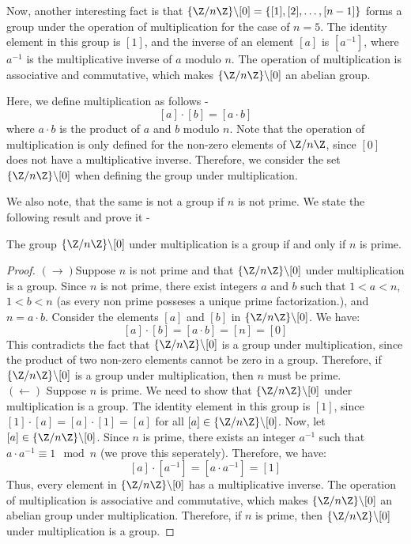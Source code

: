 \documentclass[openany]{book}
\begin{document}
Now, another interesting fact is that $\{\Z/n\Z\} \backslash {[0]} = \{[1], [2], \ldots, [n-1]\}$ forms a group under the operation of multiplication for the case of $n=5$. The identity element in this group is $[1]$, and the inverse of an element $[a]$ is $[a^{-1}]$, where $a^{-1}$ is the multiplicative inverse of $a$ modulo $n$. The operation of multiplication is associative and commutative, which makes $\{\Z/n\Z\} \backslash {[0]}$ an abelian group. \\
\begin{mynote}
    Here, we define multiplication as follows - 
    \[[a] \cdot [b] = [a \cdot b]\]
    where $a \cdot b$ is the product of $a$ and $b$ modulo $n$. Note that the operation of multiplication is only defined for the non-zero elements of $\Z/n\Z$, since $[0]$ does not have a multiplicative inverse. Therefore, we consider the set $\{\Z/n\Z\} \backslash {[0]}$ when defining the group under multiplication.
\end{mynote}
We also note, that the same is not a group if $n$ is not prime. 
We state the following result and prove it - 
\begin{mytheorem}
    The group $\{\Z/n\Z\} \backslash {[0]}$ under multiplication is a group if and only if $n$ is prime.
\end{mytheorem}
\begin{proof}
    $(\rightarrow)$Suppose $n$ is not prime and that $\{\Z/n\Z\} \backslash {[0]}$ under multiplication is a group. Since $n$ is not prime, there exist integers $a$ and $b$ such that $1 < a < n$, $1 < b < n$ (as every non prime posseses a unique prime factorization.), and $n = a \cdot b$. Consider the elements $[a]$ and $[b]$ in $\{\Z/n\Z\} \backslash {[0]}$. We have:
    \[[a] \cdot [b] = [a \cdot b] = [n] = [0]\]
    This contradicts the fact that $\{\Z/n\Z\} \backslash {[0]}$ is a group under multiplication, since the product of two non-zero elements cannot be zero in a group. Therefore, if $\{\Z/n\Z\} \backslash {[0]}$ is a group under multiplication, then $n$ must be prime. \\
    $(\leftarrow)$ Suppose $n$ is prime. We need to show that $\{\Z/n\Z\} \backslash {[0]}$ under multiplication is a group. The identity element in this group is $[1]$, since $[1] \cdot [a] = [a] \cdot [1] = [a]$ for all $[a] \in \{\Z/n\Z\} \backslash {[0]}$. Now, let $[a] \in \{\Z/n\Z\} \backslash {[0]}$. Since $n$ is prime, there exists an integer $a^{-1}$ such that $a \cdot a^{-1} \equiv 1 \mod n$ (we prove this seperately). Therefore, we have:
\[[a] \cdot [a^{-1}] = [a \cdot a^{-1}] = [1]\]
Thus, every element in $\{\Z/n\Z\} \backslash {[0]}$ has a multiplicative inverse. The operation of multiplication is associative and commutative, which makes $\{\Z/n\Z\} \backslash {[0]}$ an abelian group under multiplication. Therefore, if $n$ is prime, then $\{\Z/n\Z\} \backslash {[0]}$ under multiplication is a group.
\end{proof}
\end{document}
